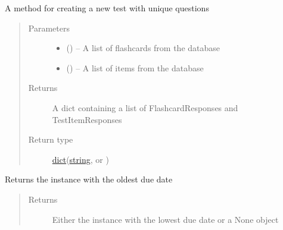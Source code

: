 \documentclass[letterpaper,10pt,english]{sphinxmanual}
\begin{document}
\begin{fulllineitems}
\begin{fulllineitems}
\label{\detokenize{user:user.User.create_test}}
A method for creating a new test with unique questions
\begin{quote}\begin{description}
\item[{Parameters}] \leavevmode\begin{itemize}
\item {} 
 (\href{https://docs.python.org/2/library/functions.html\#list}{}\sphinxstyleliteralemphasis{)}\sphinxstyleliteralemphasis{}) -- A list of flashcards from the database

\item {} 
 (\href{https://docs.python.org/2/library/functions.html\#list}{}\sphinxstyleliteralemphasis{)}\sphinxstyleliteralemphasis{}) -- A list of items from the database

\end{itemize}

\item[{Returns}] \leavevmode
A dict containing a list of FlashcardResponses and TestItemResponses

\item[{Return type}] \leavevmode
\href{https://docs.python.org/2/library/stdtypes.html\#dict}{dict}(\href{https://docs.python.org/2/library/string.html\#module-string}{string}, {\hyperref[\detokenize{flashcard:flashcard.Flashcard}]{}} or {\hyperref[\detokenize{test_item:test_item.TestItem}]{}})

\end{description}\end{quote}

\end{fulllineitems}


\begin{fulllineitems}
\label{\detokenize{user:user.User.get_due_instance}}
Returns the instance with the oldest due date
\begin{quote}\begin{description}
\item[{Returns}] \leavevmode
Either the instance with the lowest due date or a None object


\end{description}
\end{quote}
\end{fulllineitems}
\end{fulllineitems}
\end{document}
